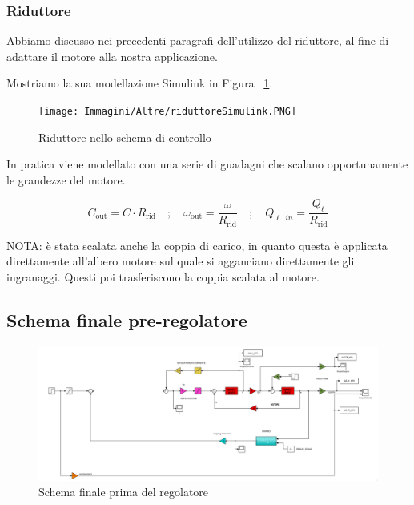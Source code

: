 \documentclass[a4paper,12pt]{article}
\begin{document}
\subsubsection{Riduttore}

Abbiamo discusso nei precedenti paragrafi dell'utilizzo del riduttore, al fine di adattare il motore alla nostra applicazione.

Mostriamo la sua modellazione Simulink in Figura ~\ref{fig:simulink_controllo_riduttore}.

\vspace{0.5cm}

\begin{figure}[h!]
\centering
    \texttt{[image: Immagini/Altre/riduttoreSimulink.PNG]}
    \caption{Riduttore nello schema di controllo}
    \label{fig:simulink_controllo_riduttore}
\end{figure}

\vspace{0.5cm}

In pratica viene modellato con una serie di guadagni che scalano opportunamente le grandezze del motore.

\[
C_{\text{out}} = C \cdot R_{\text{rid}} \quad ; \quad
\omega_{\text{out}} = \frac{\omega}{R_{\text{rid}}} \quad ; \quad
Q_{\ell,in} = \frac{Q_{\ell}}{R_{\text{rid}}}
\]

\vspace{0.5cm}
NOTA: è stata scalata anche la coppia di carico, in quanto questa è applicata direttamente all'albero motore sul quale si agganciano direttamente gli ingranaggi. Questi poi trasferiscono la coppia scalata al motore.


\subsection{Schema finale pre-regolatore}

\begin{figure}[h!]
\centering
    \includegraphics[scale=0.5]{Immagini/Altre/preRegolatoreSimulink.PNG}
    \caption{Schema finale prima del regolatore}
    \label{fig:simulink_pre_regolatore}
\end{figure}
\end{document}
